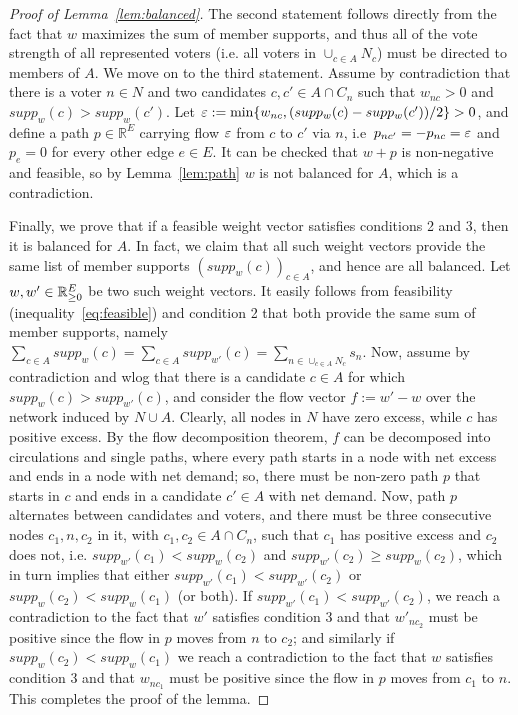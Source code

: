 \begin{proof}[Proof of Lemma~\ref{lem:balanced}]
The second statement follows directly from the fact that $w$ maximizes the sum of member supports, and thus all of the vote strength of all represented voters (i.e. all voters in $\cup_{c\in A} N_c$) must be directed to members of $A$. 
We move on to the third statement. 
Assume by contradiction that there is a voter $n\in N$ and two candidates $c, c'\in A\cap C_n$ such that $w_{nc}>0$ and $supp_w(c)>supp_w(c')$. 
Let $\varepsilon:=\min\{w_{nc}, (supp_w(c)-supp_w(c'))/2\}>0$, and define a path $p\in\mathbb{R}^E$ carrying flow $\varepsilon$ from $c$ to $c'$ via $n$, i.e~$p_{nc'}=-p_{nc}=\varepsilon$ and $p_e=0$ for every other edge $e\in E$. 
It can be checked that $w+p$ is non-negative and feasible, so by Lemma~\ref{lem:path} $w$ is not balanced for $A$, which is a contradiction. 

Finally, we prove that if a feasible weight vector satisfies conditions 2 and 3, then it is balanced for $A$. 
In fact, we claim that all such weight vectors provide the same list of member supports $(supp_w(c))_{c\in A}$, and hence are all balanced. 
Let $w, w'\in\mathbb{R}_{\geq 0}^E$ be two such weight vectors. It easily follows from feasibility (inequality~\ref{eq:feasible}) and condition 2 that both provide the same sum of member supports, namely $\sum_{c\in A} supp_w(c) = \sum_{c\in A} supp_{w'}(c) =\sum_{n\in \cup_{c\in A} N_c} s_n$. 
Now, assume by contradiction and wlog that there is a candidate $c\in A$ for which $supp_{w}(c)>supp_{w'}(c)$, and consider the flow vector $f:=w'-w$ over the network induced by $N\cup A$. Clearly, all nodes in $N$ have zero excess, while $c$ has positive excess.
By the flow decomposition theorem, $f$ can be decomposed into circulations and single paths, where every path starts in a node with net excess and ends in a node with net demand; so, there must be non-zero path $p$ that starts in $c$ and ends in a candidate $c'\in A$ with net demand. 
Now, path $p$ alternates between candidates and voters, and there must be three consecutive nodes $c_1, n, c_2$ in it, with $c_1, c_2\in A\cap C_{n}$, such that $c_1$ has positive excess and $c_2$ does not, i.e. $supp_{w'}(c_1)<supp_w(c_2)$ and $supp_{w'}(c_2)\geq supp_w(c_2)$, which in turn implies that either $supp_{w'}(c_1)<supp_{w'}(c_2)$ or $supp_w(c_2)<supp_{w}(c_1)$ (or both). 
If $supp_{w'}(c_1)<supp_{w'}(c_2)$, we reach a contradiction to the fact that $w'$ satisfies condition 3 and that $w'_{nc_2}$ must be positive since the flow in $p$ moves from $n$ to $c_2$; 
and similarly if $supp_w(c_2)<supp_{w}(c_1)$ we reach a contradiction to the fact that $w$ satisfies condition 3 and that $w_{nc_1}$ must be positive since the flow in $p$ moves from $c_1$ to $n$. This completes the proof of the lemma.
\end{proof}


